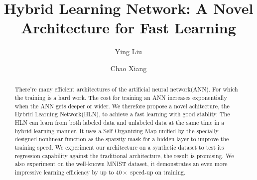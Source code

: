 \documentclass[3p,times,procedia]{elsarticle}
\begin{document}
\begin{frontmatter}




\title{Hybrid Learning Network: 
	A Novel Architecture for
	Fast Learning}


\author[u1,u2]{Ying Liu}
\author[u1]{Chao Xiang}

\address[u1]{School of Computer 
	and Engineering, University of 
	Chinese Academy of Sciences, 
	Beijing, 100190 China}
\address[u2]{Key Lab of Big Data
	Mining and Knowledge Management,
	Chinese Academy of Sciences,
	Beijing, 100190 China}

\begin{abstract}
There're many efficient architectures 
of the artificial neural network(ANN).
For which the training is a hard work.
The cost for training an ANN increases
exponentially when the ANN gets deeper 
or wider. 
We therefore propose a novel 
achitecture, the Hybrid Learning
Network(HLN), to achieve a fast learning 
with good stablity.
The HLN can learn from both
labeled data and unlabeled data
at the same time in a hybrid
learning manner.
It uses a Self Organizing Map unified
by the specially designed nonlinear
function as the sparsity mask 
for a hidden layer to improve 
the training speed.
We experiment our architecture on 
a synthetic dataset to test its 
regression capability against the
traditional architecture, the result 
is promising.
We also experiment on the well-known
MNIST dataset, it demonstrates an 
even more impressive learning efficiency 
by up to $40\times$ speed-up on training.
\end{abstract}


\end{frontmatter}
\end{document}
